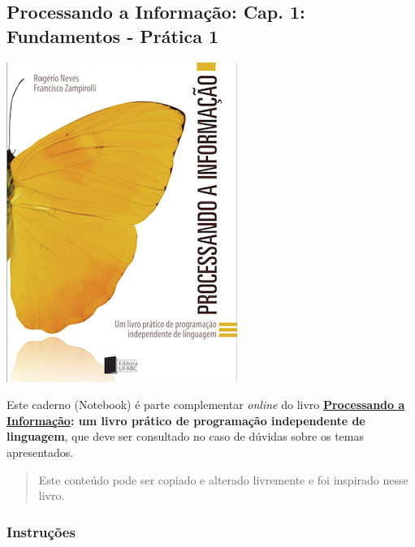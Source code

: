 \documentclass[12pt,a4paper]{article}
\begin{document}
    \hypertarget{processando-a-informauxe7uxe3o-cap.-1-fundamentos---pruxe1tica-1}{%
\subsection{Processando a Informação: Cap. 1: Fundamentos - Prática
1}\label{processando-a-informauxe7uxe3o-cap.-1-fundamentos---pruxe1tica-1}}

    \includegraphics{"figs/Capa_Processando_Informacao.jpg"}

Este caderno (Notebook) é parte complementar \emph{online} do livro
\textbf{\href{https://editora.ufabc.edu.br/matematica-e-ciencias-da-computacao/58-processando-a-informacao}{Processando
a Informação}: um livro prático de programação independente de
linguagem}, que deve ser consultado no caso de dúvidas sobre os temas
apresentados.

\begin{quote}
Este conteúdo pode ser copiado e alterado livremente e foi inspirado
nesse livro.
\end{quote}

    \hypertarget{instruuxe7uxf5es}{%
\subsubsection{Instruções}\label{instruuxe7uxf5es}}
\end{document}
